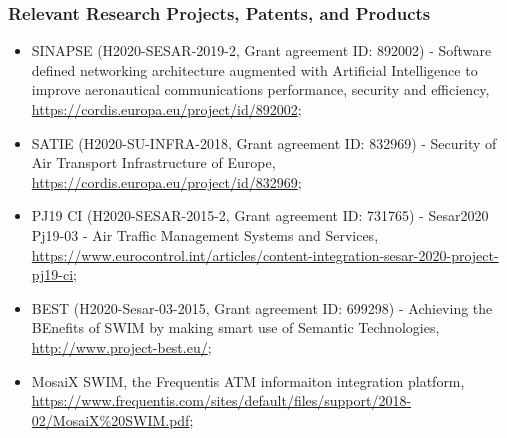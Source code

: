 \documentclass[a4paper,11pt]{article}
\begin{document}
\subsubsection*{Relevant Research Projects, Patents, and Products}

\begin{itemize}

\item SINAPSE (H2020-SESAR-2019-2, Grant agreement ID: 892002) - Software defined networking architecture augmented with Artificial Intelligence to improve aeronautical communications performance, security and efficiency, \url{https://cordis.europa.eu/project/id/892002};

\item SATIE (H2020-SU-INFRA-2018, Grant agreement ID: 832969) - Security of Air Transport Infrastructure of Europe, \url{https://cordis.europa.eu/project/id/832969};


\item PJ19 CI (H2020-SESAR-2015-2, Grant agreement ID: 731765) - Sesar2020 Pj19-03 - Air Traffic Management Systems and Services, \url{https://www.eurocontrol.int/articles/content-integration-sesar-2020-project-pj19-ci};

\item BEST (H2020-Sesar-03-2015, Grant agreement ID: 699298) - Achieving the BEnefits of SWIM by making smart use of Semantic Technologies, \url{http://www.project-best.eu/};




\item MosaiX SWIM, the Frequentis ATM informaiton integration platform, \url{https://www.frequentis.com/sites/default/files/support/2018-02/MosaiX\%20SWIM.pdf}; 

\end{itemize}
\end{document}
